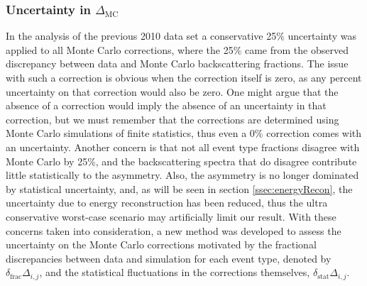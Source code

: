 \subsubsection{Uncertainty in $\Delta_{\mathrm{MC}}$} \label{sssec:mcuncert}

In the analysis of the previous 2010 data set \cite{mendenhall2013} a
conservative 25\% uncertainty was applied to all Monte Carlo corrections, where the
25\% came from the observed discrepancy between data and Monte Carlo backscattering
fractions.  
The issue with such a correction is obvious when the correction itself is zero, as
any percent uncertainty on that correction would also be zero. One might argue that
the absence of a correction would imply the absence of an uncertainty in that correction,
but we must remember that the corrections are determined using Monte Carlo simulations
of finite statistics, thus even a 0\% correction comes with an uncertainty.
Another concern is that not all event type fractions disagree with Monte Carlo by
25\%, and the backscattering spectra that do disagree contribute little statistically
to the asymmetry. Also, the asymmetry is no longer dominated by statistical uncertainty,
and, as will be seen in section \ref{ssec:energyRecon}, the uncertainty due to energy
reconstruction has been reduced, thus the ultra conservative worst-case scenario may
artificially limit our result.
With these  concerns taken into consideration, a new method was developed to assess
the uncertainty on the Monte Carlo corrections motivated by the fractional discrepancies
between data and simulation for each event type, denoted by $\delta_{\mathrm{frac}}\Delta_{i,j}$,
and the statistical fluctuations in the
corrections themselves, $\delta_{\mathrm{stat}}\Delta_{i,j}$.
%
